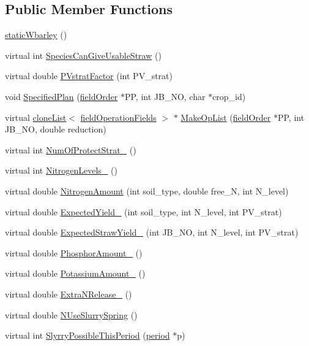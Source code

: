 \subsection*{Public Member Functions}
\begin{DoxyCompactItemize}
\item 
\hyperlink{classstatic_wbarley_acec00af600f34672e3aadf804c1815fd}{staticWbarley} ()
\item 
virtual int \hyperlink{classstatic_wbarley_a6abd8574805399b475df1488198bdd0f}{SpeciesCanGiveUsableStraw} ()
\item 
virtual double \hyperlink{classstatic_wbarley_a2d54e7d2ac7b1ca840dcb5d3780543b2}{PVstratFactor} (int PV\_\-strat)
\item 
void \hyperlink{classstatic_wbarley_a27f5a783e0d40a5114a80da6d68649ef}{SpecifiedPlan} (\hyperlink{classfield_order}{fieldOrder} $\ast$PP, int JB\_\-NO, char $\ast$crop\_\-id)
\item 
virtual \hyperlink{classclone_list}{cloneList}$<$ \hyperlink{classfield_operation_fields}{fieldOperationFields} $>$ $\ast$ \hyperlink{classstatic_wbarley_a6bfa41145c475ecf8c8dba2e4956f07b}{MakeOpList} (\hyperlink{classfield_order}{fieldOrder} $\ast$PP, int JB\_\-NO, double reduction)
\item 
virtual int \hyperlink{classstatic_wbarley_a2c42b2ae215233e89c866bdf9bb8b395}{NumOfProtectStrat\_\-} ()
\item 
virtual int \hyperlink{classstatic_wbarley_a77ecffa309df198f3479313e7aabfb27}{NitrogenLevels\_\-} ()
\item 
virtual double \hyperlink{classstatic_wbarley_a8a889b049e3d78285a74ccf0bb0145a2}{NitrogenAmount} (int soil\_\-type, double free\_\-N, int N\_\-level)
\item 
virtual double \hyperlink{classstatic_wbarley_a247a23ce822b41692fb07633cd332423}{ExpectedYield\_\-} (int soil\_\-type, int N\_\-level, int PV\_\-strat)
\item 
virtual double \hyperlink{classstatic_wbarley_a6393940adf0cf43b69854fc2050e5eda}{ExpectedStrawYield\_\-} (int JB\_\-NO, int N\_\-level, int PV\_\-strat)
\item 
virtual double \hyperlink{classstatic_wbarley_a35b376e9216edc2f8ac37916e657308f}{PhosphorAmount\_\-} ()
\item 
virtual double \hyperlink{classstatic_wbarley_ac92789d3d8a25132f60546b85f92400b}{PotassiumAmount\_\-} ()
\item 
virtual double \hyperlink{classstatic_wbarley_a7d37987b485ea121e57e3fdacb015673}{ExtraNRelease\_\-} ()
\item 
virtual double \hyperlink{classstatic_wbarley_a13213cb1959283fc557cb0ff49e8c587}{NUseSlurrySpring} ()
\item 
virtual int \hyperlink{classstatic_wbarley_a800178fb5dca9585040d0b9abd92d6b9}{SlyrryPossibleThisPeriod} (\hyperlink{classperiod}{period} $\ast$p)
\end{DoxyCompactItemize}
